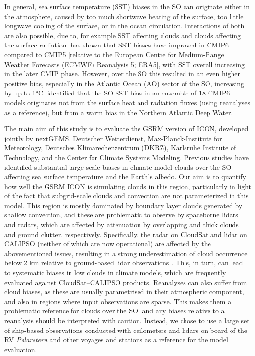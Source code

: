 \documentclass[12pt,a4paper]{article}
\begin{document}
In general, sea surface temperature (SST) biases in the SO can originate either
in the atmosphere, caused by too much shortwave heating of the surface, too
little longwave cooling of the surface, or in the ocean circulation.
Interactions of both are also possible, due to, for example SST affecting
clouds and clouds affecting the surface radiation. \cite{zhang2023} has shown
that SST biases have improved in CMIP6 compared to CMIP5 [relative to the
European Centre for Medium-Range Weather Forecasts (ECMWF) Reanalysis 5; ERA5],
with SST overall increasing in the later CMIP phase. However, over the SO this
resulted in an even higher positive bias, especially in the Atlantic Ocean (AO)
sector of the SO, increasing by up to 1°C.  \cite{luo2023} identified that the
SO SST bias in an ensemble of 18 CMIP6 models originates not from the surface
heat and radiation fluxes (using reanalyses as a reference), but from a warm
bias in the Northern Atlantic Deep Water.

The main aim of this study is to evaluate the GSRM version of ICON, developed
jointly by nextGEMS, Deutscher Wetterdienst, Max-Planck-Institute for
Meteorology, Deutsches Klimarechenzentrum (DKRZ), Karlsruhe Institute of
Technology, and the Center for Climate Systems Modeling.  Previous studies have
identified substantial large-scale biases in climate model clouds over the SO,
affecting sea surface temperature and the Earth’s albedo. Our aim is to
quantify how well the GSRM ICON is simulating clouds in this region,
particularly in light of the fact that subgrid-scale clouds and convection are
not parameterized in this model. This region is mostly dominated by boundary
layer clouds generated by shallow convection, and these are problematic to
observe by spaceborne lidars and radars, which are affected by attenuation by
overlapping and thick clouds and ground clutter, respectively.  Specifically,
the radar on CloudSat and lidar on CALIPSO (neither of which are now operational) are affected by the abovementioned issues, resulting in a strong
underestimation of cloud occurrence below 2 km relative to ground-based lidar
observations \citep{mcerlich2021}.  This, in turn, can lead to systematic
biases in low clouds in climate models, which are frequently evaluated against
CloudSat--CALIPSO products. Reanalyses can also suffer from cloud biases, as
these are usually parametrised in their atmospheric component, and also in
regions where input observations are sparse.  This makes them a problematic
reference for clouds over the SO, and any biases relative to a reanalysis
should be interpreted with caution. Instead, we chose to use a large set of
ship-based observations conducted with ceilometers and lidars on board of the
RV \emph{Polarstern} and other voyages and stations as a reference for the
model evaluation.
\end{document}
